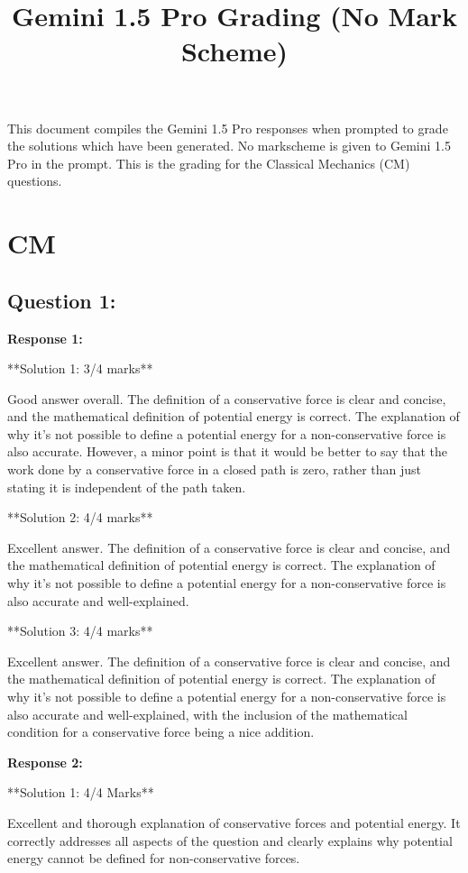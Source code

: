 \documentclass[a4paper,11pt]{article}
\title{Gemini 1.5 Pro Grading (No Mark Scheme)}
\begin{document}
\maketitle
This document compiles the Gemini 1.5 Pro responses when prompted to grade the solutions which have been generated. No markscheme is given to Gemini 1.5 Pro in the prompt. This is the grading for the Classical Mechanics (CM) questions. 

\section{CM}
\subsection*{Question 1:}

\textbf{Response 1:}

**Solution 1: 3/4 marks**

Good answer overall. The definition of a conservative force is clear and concise, and the mathematical definition of potential energy is correct. The explanation of why it's not possible to define a potential energy for a non-conservative force is also accurate. However, a minor point is that it would be better to say that the work done by a conservative force in a closed path is zero, rather than just stating it is independent of the path taken.

**Solution 2: 4/4 marks**

Excellent answer. The definition of a conservative force is clear and concise, and the mathematical definition of potential energy is correct. The explanation of why it's not possible to define a potential energy for a non-conservative force is also accurate and well-explained.

**Solution 3: 4/4 marks**

Excellent answer. The definition of a conservative force is clear and concise, and the mathematical definition of potential energy is correct. The explanation of why it's not possible to define a potential energy for a non-conservative force is also accurate and well-explained, with the inclusion of the mathematical condition for a conservative force being a nice addition.

\bigskip    
\textbf{Response 2:}

**Solution 1: 4/4 Marks**

Excellent and thorough explanation of conservative forces and potential energy. It correctly addresses all aspects of the question and clearly explains why potential energy cannot be defined for non-conservative forces.
\end{document}
